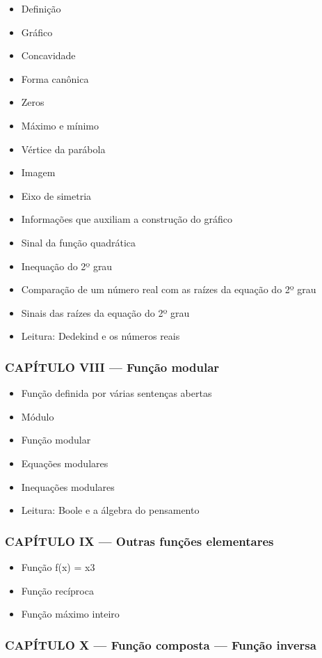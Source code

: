 \documentclass[a4paper,12pt]{article}[abntex2]
\begin{document}
\begin{itemize}
\item Definição
\item Gráfico
\item Concavidade
\item Forma canônica
\item Zeros
\item Máximo e mínimo
\item Vértice da parábola
\item Imagem
\item Eixo de simetria
\item Informações que auxiliam a construção do gráfico
\item Sinal da função quadrática
\item Inequação do 2º grau
\item Comparação de um número real com as raízes da equação do 2º grau
\item Sinais das raízes da equação do 2º grau
\item Leitura: Dedekind e os números reais
\end{itemize}
\subsubsection*{CAPÍTULO VIII — Função modular}

\begin{itemize}
\item Função definida por várias sentenças abertas
\item Módulo
\item Função modular
\item Equações modulares
\item Inequações modulares
\item Leitura: Boole e a álgebra do pensamento
\end{itemize}
\subsubsection*{CAPÍTULO IX — Outras funções elementares}

\begin{itemize}
\item Função f(x) = x3
\item Função recíproca
\item Função máximo inteiro
\end{itemize}
\subsubsection*{CAPÍTULO X — Função composta — Função inversa}
\end{document}
